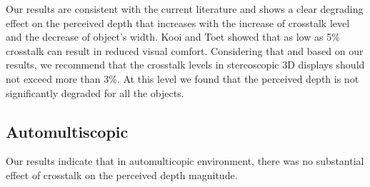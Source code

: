 Our results are consistent with the current literature and shows a clear degrading effect on the perceived depth that increases with the increase of crosstalk level and the decrease of object's width. Kooi and Toet \cite{kooi2004visual} showed that as low as 5\% crosstalk can result in reduced visual comfort. Considering that and based on our results, we recommend that the crosstalk levels in stereoscopic 3D displays should not exceed more than 3\%. At this level we found that the perceived depth is not significantly degraded for all the objects. %


\subsection{Automultiscopic}

Our results indicate that in automulticopic environment, there was no substantial effect of crosstalk on the perceived depth magnitude.

